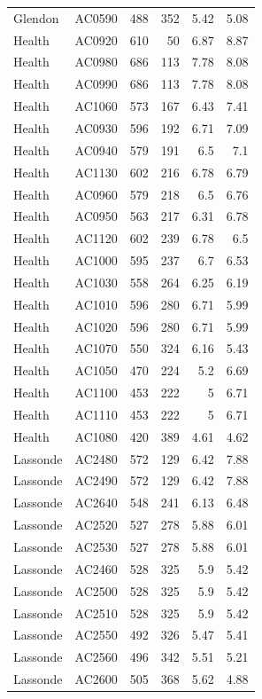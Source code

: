 \documentclass[article,10pt,microtype]{article}
\begin{document}
\begin{longtable}{llrrrr}
Glendon & AC0590 & 488 & 352 & 5.42 & 5.08\\
Health & AC0920 & 610 & 50 & 6.87 & 8.87\\
Health & AC0980 & 686 & 113 & 7.78 & 8.08\\
Health & AC0990 & 686 & 113 & 7.78 & 8.08\\
Health & AC1060 & 573 & 167 & 6.43 & 7.41\\
Health & AC0930 & 596 & 192 & 6.71 & 7.09\\
Health & AC0940 & 579 & 191 & 6.5 & 7.1\\
Health & AC1130 & 602 & 216 & 6.78 & 6.79\\
Health & AC0960 & 579 & 218 & 6.5 & 6.76\\
Health & AC0950 & 563 & 217 & 6.31 & 6.78\\
Health & AC1120 & 602 & 239 & 6.78 & 6.5\\
Health & AC1000 & 595 & 237 & 6.7 & 6.53\\
Health & AC1030 & 558 & 264 & 6.25 & 6.19\\
Health & AC1010 & 596 & 280 & 6.71 & 5.99\\
Health & AC1020 & 596 & 280 & 6.71 & 5.99\\
Health & AC1070 & 550 & 324 & 6.16 & 5.43\\
Health & AC1050 & 470 & 224 & 5.2 & 6.69\\
Health & AC1100 & 453 & 222 & 5 & 6.71\\
Health & AC1110 & 453 & 222 & 5 & 6.71\\
Health & AC1080 & 420 & 389 & 4.61 & 4.62\\
Lassonde & AC2480 & 572 & 129 & 6.42 & 7.88\\
Lassonde & AC2490 & 572 & 129 & 6.42 & 7.88\\
Lassonde & AC2640 & 548 & 241 & 6.13 & 6.48\\
Lassonde & AC2520 & 527 & 278 & 5.88 & 6.01\\
Lassonde & AC2530 & 527 & 278 & 5.88 & 6.01\\
Lassonde & AC2460 & 528 & 325 & 5.9 & 5.42\\
Lassonde & AC2500 & 528 & 325 & 5.9 & 5.42\\
Lassonde & AC2510 & 528 & 325 & 5.9 & 5.42\\
Lassonde & AC2550 & 492 & 326 & 5.47 & 5.41\\
Lassonde & AC2560 & 496 & 342 & 5.51 & 5.21\\
Lassonde & AC2600 & 505 & 368 & 5.62 & 4.88\\

\end{longtable}
\end{document}
